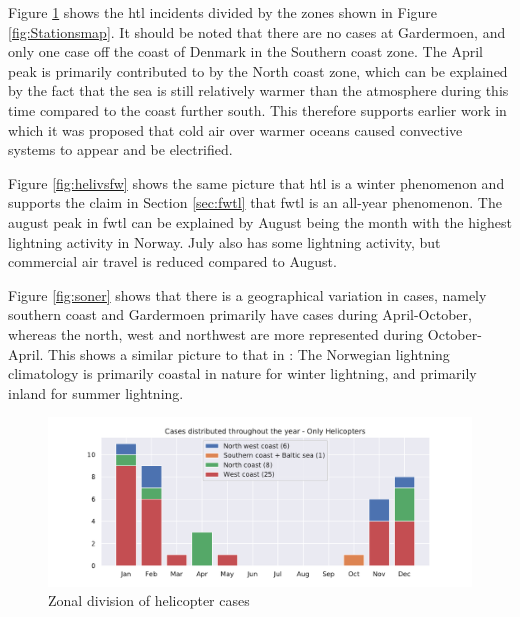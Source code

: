 Figure \ref{fig:helisoner} shows the \acrshort{htl} incidents divided by the zones shown in Figure \ref{fig:Stationsmap}. It should be noted that there are no cases at Gardermoen, and only one case off the coast of Denmark in the Southern coast zone. The April peak is primarily contributed to by the North coast zone, which can be explained by the fact that the sea is still relatively warmer than the atmosphere during this time compared to the coast further south. This therefore supports earlier work in which it was proposed that cold air over warmer oceans caused convective systems to appear and be electrified. 

Figure \ref{fig:helivsfw} shows the same picture that \acrshort{htl} is a winter phenomenon and supports the claim in Section \ref{sec:fwtl} that \acrshort{fwtl} is an all-year phenomenon. The august peak in \acrshort{fwtl} can be explained by August being the month with the highest lightning activity in Norway. July also has some lightning activity, but commercial air travel is reduced compared to August. 

Figure \ref{fig:soner} shows that there is a geographical variation in cases, namely southern coast and Gardermoen primarily have cases during April-October, whereas the north, west and northwest are more represented during October-April. This shows a similar picture to that in \cite{koeltzow2018}: The Norwegian lightning climatology is primarily coastal in nature for winter lightning, and primarily inland for summer lightning. 


\begin{figure}[H]
    \centering
    \includegraphics[width=\textwidth]{Figures/Helisoner.pdf}
    \caption{Zonal division of helicopter cases}
    \label{fig:helisoner}
\end{figure}


